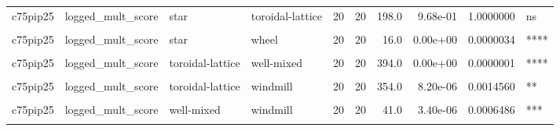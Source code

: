 \documentclass[
]{book}
\begin{document}
\begin{table}
\begin{tabular}{l|l|l|l|r|r|r|r|r|l}
\cellcolor{gray!6}{c75pip25} & \cellcolor{gray!6}{logged\_mult\_score} & \cellcolor{gray!6}{random-waxman} & \cellcolor{gray!6}{windmill} & \cellcolor{gray!6}{20} & \cellcolor{gray!6}{20} & \cellcolor{gray!6}{317.0} & \cellcolor{gray!6}{1.00e-03} & \cellcolor{gray!6}{0.1430000} & \cellcolor{gray!6}{ns}\\
\hline
c75pip25 & logged\_mult\_score & star & toroidal-lattice & 20 & 20 & 198.0 & 9.68e-01 & 1.0000000 & ns\\
\hline
\cellcolor{gray!6}{c75pip25} & \cellcolor{gray!6}{logged\_mult\_score} & \cellcolor{gray!6}{star} & \cellcolor{gray!6}{well-mixed} & \cellcolor{gray!6}{20} & \cellcolor{gray!6}{20} & \cellcolor{gray!6}{390.0} & \cellcolor{gray!6}{0.00e+00} & \cellcolor{gray!6}{0.0000005} & \cellcolor{gray!6}{****}\\
\hline
c75pip25 & logged\_mult\_score & star & wheel & 20 & 20 & 16.0 & 0.00e+00 & 0.0000034 & ****\\
\hline
\cellcolor{gray!6}{c75pip25} & \cellcolor{gray!6}{logged\_mult\_score} & \cellcolor{gray!6}{star} & \cellcolor{gray!6}{windmill} & \cellcolor{gray!6}{20} & \cellcolor{gray!6}{20} & \cellcolor{gray!6}{355.0} & \cellcolor{gray!6}{6.90e-06} & \cellcolor{gray!6}{0.0012507} & \cellcolor{gray!6}{**}\\
\hline
c75pip25 & logged\_mult\_score & toroidal-lattice & well-mixed & 20 & 20 & 394.0 & 0.00e+00 & 0.0000001 & ****\\
\hline
\cellcolor{gray!6}{c75pip25} & \cellcolor{gray!6}{logged\_mult\_score} & \cellcolor{gray!6}{toroidal-lattice} & \cellcolor{gray!6}{wheel} & \cellcolor{gray!6}{20} & \cellcolor{gray!6}{20} & \cellcolor{gray!6}{35.0} & \cellcolor{gray!6}{1.10e-06} & \cellcolor{gray!6}{0.0002339} & \cellcolor{gray!6}{***}\\
\hline
c75pip25 & logged\_mult\_score & toroidal-lattice & windmill & 20 & 20 & 354.0 & 8.20e-06 & 0.0014560 & **\\
\hline
\cellcolor{gray!6}{c75pip25} & \cellcolor{gray!6}{logged\_mult\_score} & \cellcolor{gray!6}{well-mixed} & \cellcolor{gray!6}{wheel} & \cellcolor{gray!6}{20} & \cellcolor{gray!6}{20} & \cellcolor{gray!6}{0.0} & \cellcolor{gray!6}{0.00e+00} & \cellcolor{gray!6}{0.0000000} & \cellcolor{gray!6}{****}\\
\hline
c75pip25 & logged\_mult\_score & well-mixed & windmill & 20 & 20 & 41.0 & 3.40e-06 & 0.0006486 & ***\\
\hline
\cellcolor{gray!6}{c75pip25} & \cellcolor{gray!6}{logged\_mult\_score} & \cellcolor{gray!6}{wheel} & \cellcolor{gray!6}{windmill} & \cellcolor{gray!6}{20} & \cellcolor{gray!6}{20} & \cellcolor{gray!6}{400.0} & \cellcolor{gray!6}{0.00e+00} & \cellcolor{gray!6}{0.0000000} & \cellcolor{gray!6}{****}\\

\end{tabular}
\end{table}
\end{document}
